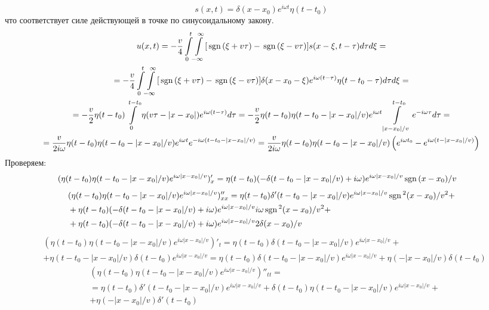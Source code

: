 \[
s(x, t) = \delta(x - x_0) e^{i\omega t} \eta(t - t_0)
\]
что соответствует силе действующей в точке по синусоидальному закону.
\[
\begin{gathered}
u(x, t) =
-\frac{v}{4} \int\limits_{0}^{t} \! \int\limits_{-\infty}^{\infty} [ \mathrm{\,sgn}\, (\xi + v \tau) - \mathrm{\,sgn}\, (\xi - v\tau) ] s(x - \xi, t - \tau) d\tau d\xi =
\\ =
-\frac{v}{4} \int\limits_{0}^{t} \! \int\limits_{-\infty}^{\infty} [ \mathrm{\,sgn}\, (\xi + v \tau) - \mathrm{\,sgn}\, (\xi - v\tau) ] \delta(x - x_0 - \xi) e^{i\omega(t - \tau)} \eta(t - t_0 - \tau) d\tau d\xi =
\\ =
-\frac{v}{2} \eta(t - t_0) \int\limits_{0}^{t - t_0} \eta(v\tau - |x - x_0|) e^{i\omega(t - \tau)} d\tau =
-\frac{v}{2} \eta(t - t_0) \eta(t - t_0 - |x -x_0|/v) e^{i\omega t} \int\limits_{|x - x_0|/v}^{t - t_0} e^{-i\omega\tau} d\tau =
\\ =
\frac{v}{2i\omega} \eta(t - t_0) \eta(t - t_0 - |x -x_0|/v) e^{i\omega t} e^{-i\omega(t - t_0 - |x - x_0|/v)} =
\frac{v}{2i\omega} \eta(t - t_0) \eta(t - t_0 - |x -x_0|/v) \left(e^{i\omega t_0} - e^{i\omega(t - |x - x_0|/v)} \right)
\end{gathered}
\]
Проверяем:
\[
\begin{aligned}
& (\eta(t - t_0) \eta(t - t_0 - |x -x_0|/v) e^{i\omega|x - x_0|/v})'_x = 
\eta(t - t_0) (-\delta(t - t_0 - |x - x_0|/v) + i \omega )e^{i\omega|x - x_0|/v}\mathrm{\,sgn}\,(x -x_0)/v
\end{aligned}
\]
\[
\begin{aligned}
& (\eta(t - t_0) \eta(t - t_0 - |x -x_0|/v) e^{i\omega|x - x_0|/v})''_{xx} = 
\eta(t - t_0) \delta'(t - t_0 - |x - x_0|/v) e^{i\omega|x - x_0|/v} \mathrm{\,sgn}\,^2(x -x_0)/v^2 +
\\ & +
\eta(t - t_0) (-\delta(t - t_0 - |x - x_0|/v) + i \omega ) e^{i\omega|x - x_0|/v} i\omega \mathrm{\,sgn}\,^2(x -x_0)/v^2 +
\\ & +
\eta(t - t_0) (-\delta(t - t_0 - |x - x_0|/v) + i \omega ) e^{i\omega|x - x_0|/v} 2\delta(x - x_0)/v
\end{aligned}
\]
\[
\begin{aligned}
& (\eta(t - t_0) \eta(t - t_0 - |x -x_0|/v) e^{i\omega|x - x_0|/v})'_{t} = 
\eta(t - t_0) \delta(t - t_0 - |x - x_0|/v) e^{i\omega|x - x_0|/v} +  
\\ & +
\eta(t - t_0 - |x - x_0|/v) \delta(t - t_0)e^{i\omega|x - x_0|/v} =
\eta(t - t_0) \delta(t - t_0 - |x - x_0|/v) e^{i\omega|x - x_0|/v} + \eta(- |x - x_0|/v)\delta(t - t_0)
\end{aligned}
\]
\[
\begin{aligned}
& (\eta(t - t_0) \eta(t - t_0 - |x -x_0|/v) e^{i\omega|x - x_0|/v})''_{tt} = 
\\ & = 
\eta(t - t_0) \delta'(t - t_0 - |x - x_0|/v) e^{i\omega|x - x_0|/v} + \delta(t - t_0) \eta(t - t_0 - |x -x_0|/v) e^{i\omega|x - x_0|/v} + 
\\ & +
\eta(- |x - x_0|/v)\delta'(t - t_0)
\end{aligned}
\]
